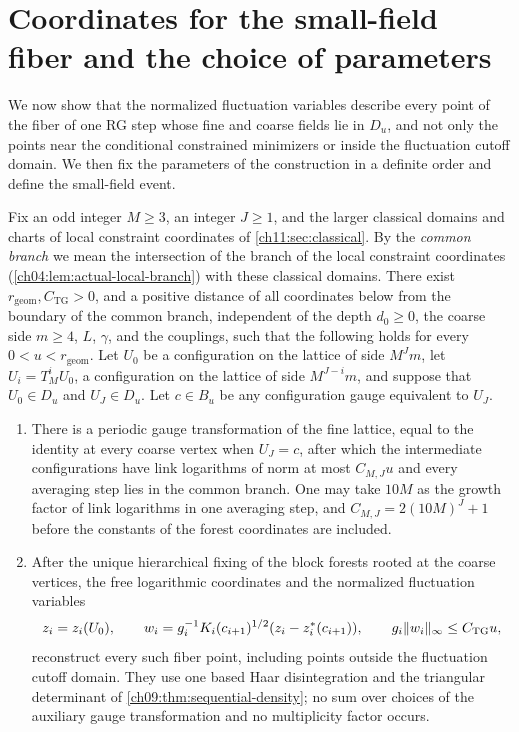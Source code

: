 \section{Coordinates for the small-field fiber and the choice of parameters}\label{ch11:sec:coordinates}

We now show that the normalized fluctuation variables describe every point of the fiber of one RG step whose fine and coarse fields lie in $D_u$, and not only the points near the conditional constrained minimizers or inside the fluctuation cutoff domain. We then fix the parameters of the construction in a definite order and define the small-field event.

\begin{theorem}\label{ch11:thm:all-point-torus-chart}
Fix an odd integer $M\ge3$, an integer $J\ge1$, and the larger classical domains and charts of local constraint coordinates of \cref{ch11:sec:classical}. By the \emph{common branch} we mean the intersection of the branch of the local constraint coordinates (\cref{ch04:lem:actual-local-branch}) with these classical domains. There exist $r_{\mathrm{geom}},C_{\mathrm{TG}}>0$, and a positive distance of all coordinates below from the boundary of the common branch, independent of the depth $d_0\ge0$, the coarse side $m\ge4$, $L$, $\gamma$, and the couplings, such that the following holds for every $0<u<r_{\mathrm{geom}}$. Let $U_0$ be a configuration on the lattice of side $M^Jm$, let $U_i=T_M^iU_0$, a configuration on the lattice of side $M^{J-i}m$, and suppose that $U_0\in D_u$ and $U_J\in D_u$. Let $c\in B_u$ be any configuration gauge equivalent to $U_J$.
\begin{enumerate}
\item There is a periodic gauge transformation of the fine lattice, equal to the identity at every coarse vertex when $U_J=c$, after which the intermediate configurations have link logarithms of norm at most $C_{M,J}u$ and every averaging step lies in the common branch. One may take $10M$ as the growth factor of link logarithms in one averaging step, and $C_{M,J}=2(10M)^J+1$ before the constants of the forest coordinates are included.
\item After the unique hierarchical fixing of the block forests rooted at the coarse vertices, the free logarithmic coordinates and the normalized fluctuation variables
\[
 z_i=z_i(U_0),\qquad
 w_i=g_i^{-1}K_i(c_{i+1})^{1/2}(z_i-z_i^*(c_{i+1})),\qquad
 g_i\lVert w_i\rVert_\infty\le C_{\mathrm{TG}}u,
\]
reconstruct every such fiber point, including points outside the fluctuation cutoff domain. They use one based Haar disintegration and the triangular determinant of \cref{ch09:thm:sequential-density}; no sum over choices of the auxiliary gauge transformation and no multiplicity factor occurs.

\end{enumerate}
\end{theorem}
